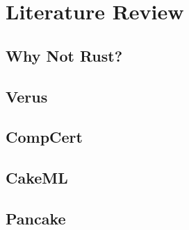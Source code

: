 \chapter{Literature Review}\label{ch:litrev}
\section{Why Not Rust?}
\section{Verus}
\section{CompCert}
\section{CakeML}
\section{Pancake}

